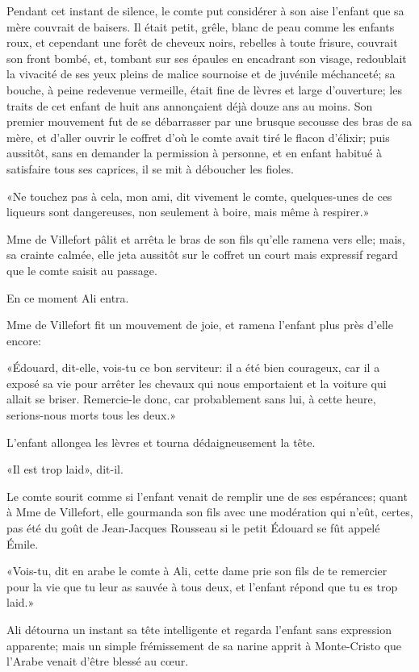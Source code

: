 Pendant cet instant de silence, le comte put considérer à son aise l'enfant que sa mère couvrait de baisers. Il était petit, grêle, blanc de peau comme les enfants roux, et cependant une forêt de cheveux noirs, rebelles à toute frisure, couvrait son front bombé, et, tombant sur ses épaules en encadrant son visage, redoublait la vivacité de ses yeux pleins de malice sournoise et de juvénile méchanceté; sa bouche, à peine redevenue vermeille, était fine de lèvres et large d'ouverture; les traits de cet enfant de huit ans annonçaient déjà douze ans au moins. Son premier mouvement fut de se débarrasser par une brusque secousse des bras de sa mère, et d'aller ouvrir le coffret d'où le comte avait tiré le flacon d'élixir; puis aussitôt, sans en demander la permission à personne, et en enfant habitué à satisfaire tous ses caprices, il se mit à déboucher les fioles. 

«Ne touchez pas à cela, mon ami, dit vivement le comte, quelques-unes de ces liqueurs sont dangereuses, non seulement à boire, mais même à respirer.» 

Mme de Villefort pâlit et arrêta le bras de son fils qu'elle ramena vers elle; mais, sa crainte calmée, elle jeta aussitôt sur le coffret un court mais expressif regard que le comte saisit au passage. 

En ce moment Ali entra. 

Mme de Villefort fit un mouvement de joie, et ramena l'enfant plus près d'elle encore: 

«Édouard, dit-elle, vois-tu ce bon serviteur: il a été bien courageux, car il a exposé sa vie pour arrêter les chevaux qui nous emportaient et la voiture qui allait se briser. Remercie-le donc, car probablement sans lui, à cette heure, serions-nous morts tous les deux.» 

L'enfant allongea les lèvres et tourna dédaigneusement la tête. 

«Il est trop laid», dit-il. 

Le comte sourit comme si l'enfant venait de remplir une de ses espérances; quant à Mme de Villefort, elle gourmanda son fils avec une modération qui n'eût, certes, pas été du goût de Jean-Jacques Rousseau si le petit Édouard se fût appelé Émile. 

«Vois-tu, dit en arabe le comte à Ali, cette dame prie son fils de te remercier pour la vie que tu leur as sauvée à tous deux, et l'enfant répond que tu es trop laid.» 

Ali détourna un instant sa tête intelligente et regarda l'enfant sans expression apparente; mais un simple frémissement de sa narine apprit à Monte-Cristo que l'Arabe venait d'être blessé au cœur. 

